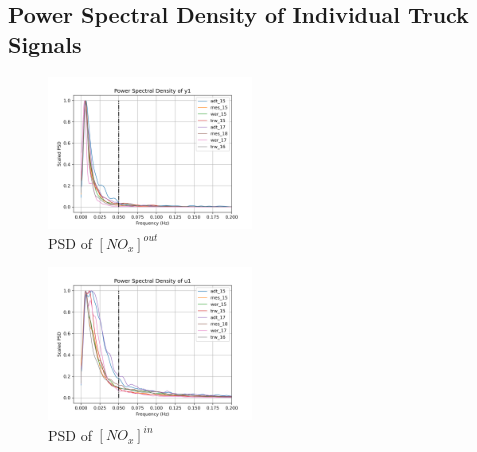 \graphicspath{{Appendices/apx1_signal_est}}
\subsection{Power Spectral Density of Individual Truck Signals}

\begin{multicols}{2}
       \begin{figure}[H]
        \centering
        \includegraphics[width=0.48\textwidth]{./figs/bfr_smth/truck_psd/y1.png}
        \caption{PSD of $[NO_x]^{out}$}
       \end{figure}

       \begin{figure}[H]
        \centering
        \includegraphics[width=0.48\textwidth]{./figs/bfr_smth/truck_psd/u1.png}
        \caption{PSD of $[NO_x]^{in}$}
       \end{figure}
\end{multicols}

